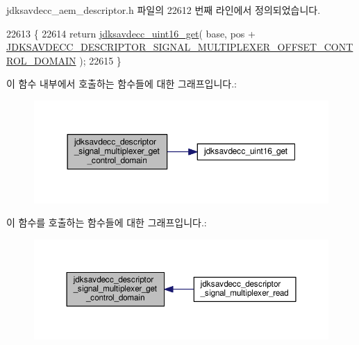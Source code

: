 jdksavdecc\+\_\+aem\+\_\+descriptor.\+h 파일의 22612 번째 라인에서 정의되었습니다.


\begin{DoxyCode}
22613 \{
22614     \textcolor{keywordflow}{return} \hyperlink{group__endian_ga3fbbbc20be954aa61e039872965b0dc9}{jdksavdecc\_uint16\_get}( base, pos + 
      \hyperlink{group__descriptor__signal__multiplexer_ga68273ac6f998262001065e2a805f7908}{JDKSAVDECC\_DESCRIPTOR\_SIGNAL\_MULTIPLEXER\_OFFSET\_CONTROL\_DOMAIN}
       );
22615 \}
\end{DoxyCode}


이 함수 내부에서 호출하는 함수들에 대한 그래프입니다.\+:
\nopagebreak
\begin{figure}[H]
\begin{center}
\leavevmode
\includegraphics[width=350pt]{group__descriptor__signal__multiplexer_ga2faf0061023fc392ae4119564d489937_cgraph}
\end{center}
\end{figure}




이 함수를 호출하는 함수들에 대한 그래프입니다.\+:
\nopagebreak
\begin{figure}[H]
\begin{center}
\leavevmode
\includegraphics[width=350pt]{group__descriptor__signal__multiplexer_ga2faf0061023fc392ae4119564d489937_icgraph}
\end{center}
\end{figure}


